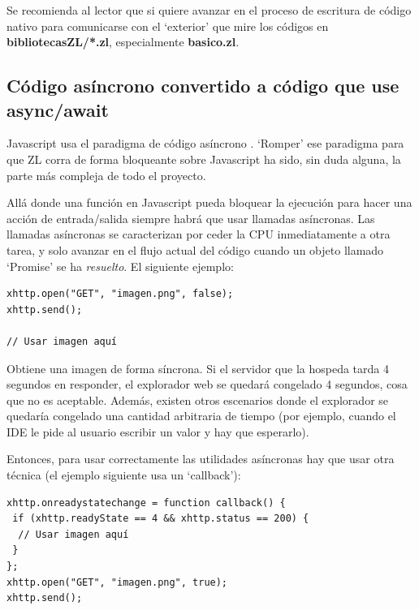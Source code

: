 \documentclass{report}
\begin{document}
	\vspace{10px}
	
	
	
	\vspace{10px}
	
	Se recomienda al lector que si quiere avanzar en el proceso de escritura de código nativo para comunicarse con el `exterior' que mire los códigos en \textbf{bibliotecasZL/*.zl}, especialmente \textbf{basico.zl}.
	
	\subsection{Código asíncrono convertido a código que use async/await}
	
	Javascript usa el paradigma de código asíncrono \cite{javascriptasync}. `Romper' ese paradigma para que ZL corra de forma bloqueante sobre Javascript ha sido, sin duda alguna, la parte más compleja de todo el proyecto. 
	
	\vspace{10px}

	Allá donde una función en Javascript pueda bloquear la ejecución para hacer una acción de entrada/salida siempre habrá que usar llamadas asíncronas. Las llamadas asíncronas se caracterizan por ceder la CPU inmediatamente a otra tarea, y solo avanzar en el flujo actual del código cuando un objeto llamado `Promise' se ha \textit{resuelto}\cite{javascript-promise}. El siguiente ejemplo:
	
\begin{BVerbatim}
xhttp.open("GET", "imagen.png", false);
xhttp.send();

// Usar imagen aquí

\end{BVerbatim}

	Obtiene una imagen de forma síncrona. Si el servidor que la hospeda tarda 4 segundos en responder, el explorador web se quedará congelado 4 segundos, cosa que no es aceptable. Además, existen otros escenarios donde el explorador se quedaría congelado una cantidad arbitraria de tiempo (por ejemplo, cuando el IDE le pide al usuario escribir un valor y hay que esperarlo).
	
	Entonces, para usar correctamente las utilidades asíncronas hay que usar otra técnica (el ejemplo siguiente usa un `callback'):


\begin{BVerbatim}
xhttp.onreadystatechange = function callback() {
 if (xhttp.readyState == 4 && xhttp.status == 200) {
  // Usar imagen aquí
 }
};
xhttp.open("GET", "imagen.png", true);
xhttp.send();
\end{BVerbatim}
\end{document}
